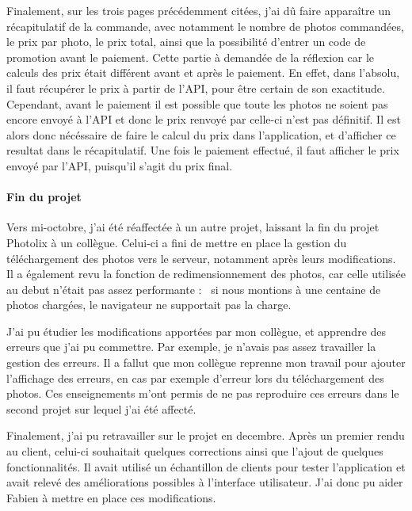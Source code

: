 \bigskip

Finalement, sur les trois pages précédemment citées, j'ai dû faire
apparaître un récapitulatif de la commande, avec notamment le nombre de
photos commandées, le prix par photo, le prix total, ainsi que la
possibilité d'entrer un code de promotion avant le paiement. Cette
partie à demandée de la réflexion car le calculs des prix était
différent avant et après le paiement. En effet, dans l'absolu, il faut
récupérer le prix à partir de l'API, pour être certain de son
exactitude. Cependant, avant le paiement il est possible que toute les
photos ne soient pas encore envoyé à l'API et donc le prix renvoyé par
celle-ci n'est pas définitif. Il est alors donc nécéssaire de faire le
calcul du prix dans l'application, et d'afficher ce resultat dans le
récapitulatif. Une fois le paiement effectué, il faut afficher le prix
envoyé par l'API, puisqu'il s'agit du prix final.

\bigskip

\paragraph{Fin du projet}\label{fin-du-projet}

\bigskip

Vers mi-octobre, j'ai été réaffectée à un autre projet, laissant la fin
du projet Photolix à un collègue. Celui-ci a fini de mettre en place la
gestion du téléchargement des photos vers le serveur, notamment après
leurs modifications. Il a également revu la fonction de
redimensionnement des photos, car celle utilisée au debut n'était pas
assez performante : ~si nous montions à une centaine de photos chargées,
le navigateur ne supportait pas la charge.

\bigskip

J'ai pu étudier les modifications apportées par mon collègue, et
apprendre des erreurs que j'ai pu commettre. Par exemple, je n'avais pas
assez travailler la gestion des erreurs. Il a fallut que mon collègue
reprenne mon travail pour ajouter l'affichage des erreurs, en cas par
exemple d'erreur lors du téléchargement des photos. Ces enseignements
m'ont permis de ne pas reproduire ces erreurs dans le second projet sur
lequel j'ai été affecté.

\bigskip

Finalement, j'ai pu retravailler sur le projet en decembre. Après un
premier rendu au client, celui-ci souhaitait quelques corrections ainsi
que l'ajout de quelques fonctionnalités. Il avait utilisé un échantillon
de clients pour tester l'application et avait relevé des améliorations
possibles à l'interface utilisateur. J'ai donc pu aider Fabien à mettre
en place ces modifications.

